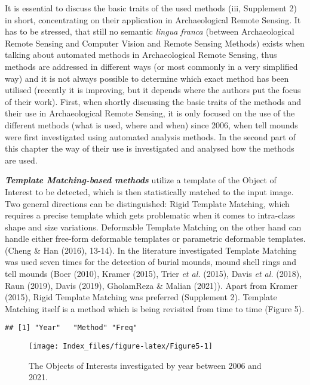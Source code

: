 \documentclass[
  12pt,
]{article}
\begin{document}
It is essential to discuss the basic traits of the used methods (iii, Supplement 2) in short, concentrating on their application in Archaeological Remote Sensing. It has to be stressed, that still no semantic \emph{lingua franca} (between Archaeological Remote Sensing and Computer Vision and Remote Sensing Methods) exists when talking about automated methods in Archaeological Remote Sensing, thus methods are addressed in different ways (or most commonly in a very simplified way) and it is not always possible to determine which exact method has been utilised (recently it is improving, but it depends where the authors put the focus of their work). First, when shortly discussing the basic traits of the methods and their use in Archaeological Remote Sensing, it is only focused on the use of the different methods (what is used, where and when) since 2006, when tell mounds were first investigated using automated analysis methods. In the second part of this chapter the way of their use is investigated and analysed how the methods are used.

\textbf{\emph{Template Matching-based methods}} utilize a template of the Object of Interest to be detected, which is then statistically matched to the input image. Two general directions can be distinguished: Rigid Template Matching, which requires a precise template which gets problematic when it comes to intra-class shape and size variations. Deformable Template Matching on the other hand can handle either free-form deformable templates or parametric deformable templates. (Cheng \& Han (2016), 13-14).
In the literature investigated Template Matching was used seven times for the detection of burial mounds, mound shell rings and tell mounds (Boer (2010), Kramer (2015), Trier \emph{et al.} (2015), Davis \emph{et al.} (2018), Raun (2019), Davis (2019), GholamReza \& Malian (2021)). Apart from Kramer (2015), Rigid Template Matching was preferred (Supplement 2). Template Matching itself is a method which is being revisited from time to time (Figure 5).

\begin{verbatim}
## [1] "Year"   "Method" "Freq"
\end{verbatim}

\begin{figure}

{\centering \texttt{[image: Index\_files/figure-latex/Figure5-1]} 

}

\caption{The Objects of Interests investigated by year between 2006 and 2021.}\label{fig:Figure5}
\end{figure}
\end{document}
